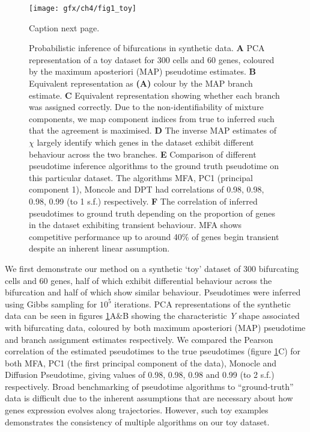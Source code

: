 \begin{figure}
	\centering
	\texttt{[image: gfx/ch4/fig1\_toy]}
 \caption[]{Caption next page.}\label{fig:toy}
\end{figure}
\addtocounter{figure}{-1}
\begin{figure}
\caption[Probabilistic inference of bifurcations in synthetic data.]{Probabilistic inference of bifurcations in synthetic data. 
\textbf{A} PCA representation of a toy dataset for 300 cells and 60 genes, coloured by the maximum aposteriori (MAP) pseudotime estimates.
\textbf{B} Equivalent representation as \textbf{(A)} colour by the MAP branch estimate.
\textbf{C} Equivalent representation showing whether each branch was assigned correctly. Due to the non-identifiability of mixture components, we map component indices from true to inferred such that the agreement is maximised.
\textbf{D} The inverse MAP estimates of $\chi$ largely identify which genes in the dataset exhibit different behaviour across the two branches.
\textbf{E} Comparison of different pseudotime inference algorithms to the ground truth pseudotime on this particular dataset. The algorithms MFA, PC1 (principal component 1), Moncole and DPT had correlations of 0.98, 0.98, 0.98, 0.99 (to 1 s.f.) respectively.
\textbf{F} The correlation of inferred pseudotimes to ground truth depending on the proportion of genes in the dataset exhibiting transient behaviour. MFA shows competitive performance up to around 40\% of genes begin transient despite an inherent linear assumption.}
\end{figure}

We first demonstrate our method on a synthetic `toy' dataset of 300 bifurcating cells and 60 genes, half of which exhibit differential behaviour across the bifurcation and half of which show similar behaviour.
Pseudotimes were inferred using Gibbs sampling for $10^5$ iterations. PCA representations of the synthetic data can be seen in figures \ref{fig:toy}A\&B showing the characteristic \emph{Y} shape associated with bifurcating data, coloured by both maximum aposteriori (MAP) pseudotime and branch assignment estimates respectively. We compared the Pearson correlation of the estimated pseudotimes to the true pseudotimes (figure \ref{fig:toy}C) for both MFA, PC1 (the first principal component of the data), Monocle and Diffusion Pseudotime, giving values of 0.98, 0.98, 0.98 and 0.99 (to 2 s.f.) respectively. Broad benchmarking of pseudotime algorithms to ``ground-truth'' data is difficult due to the inherent assumptions that are necessary about how genes expression evolves along trajectories. However, such toy examples demonstrates the consistency of multiple algorithms on our toy dataset.


